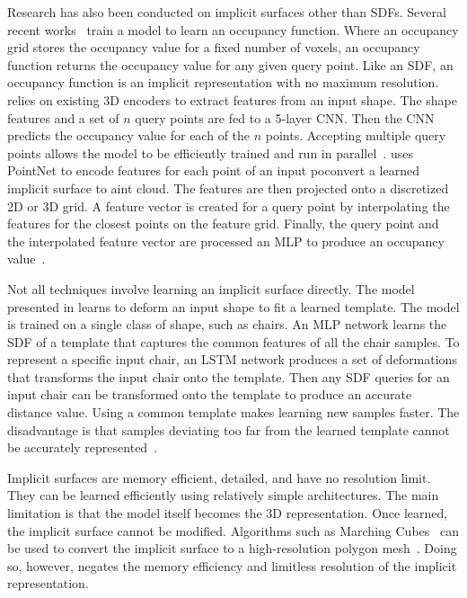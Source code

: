 Research has also been conducted on implicit surfaces other than SDFs. Several recent works~\cite{Mescheder2019, Peng2020} train a model to learn an occupancy function. Where an occupancy grid stores the occupancy value for a fixed number of voxels, an occupancy function returns the occupancy value for any given query point. Like an SDF, an occupancy function is an implicit representation with no maximum resolution. \cite{Mescheder2019} relies on existing 3D encoders to extract features from an input shape. The shape features and a set of $n$ query points are fed to a 5-layer CNN. Then the CNN predicts the occupancy value for each of the $n$ points. Accepting multiple query points allows the model to be efficiently trained and run in parallel~\cite{Mescheder2019}. \cite{Peng2020} uses PointNet to encode features for each point of an input poconvert a learned implicit surface to aint cloud. The features are then projected onto a discretized 2D or 3D grid. A feature vector is created for a query point by interpolating the features for the closest points on the feature grid. Finally, the query point and the interpolated feature vector are processed an MLP to produce an occupancy value~\cite{Peng2020}.

Not all techniques involve learning an implicit surface directly. The model presented in \cite{Zheng2021} learns to deform an input shape to fit a learned template. The model is trained on a single class of shape, such as chairs. An MLP network learns the SDF of a template that captures the common features of all the chair samples. To represent a specific input chair, an LSTM network produces a set of deformations that transforms the input chair onto the template. Then any SDF queries for an input chair can be transformed onto the template to produce an accurate distance value. Using a common template makes learning new samples faster. The disadvantage is that samples deviating too far from the learned template cannot be accurately represented~\cite{Zheng2021}.

Implicit surfaces are memory efficient, detailed, and have no resolution limit. They can be learned efficiently using relatively simple architectures. The main limitation is that the model itself becomes the 3D representation. Once learned, the implicit surface cannot be modified. Algorithms such as Marching Cubes~\cite{Lorensen1987} can be used to convert the implicit surface to a high-resolution polygon mesh~\cite{Xiao2020}. Doing so, however, negates the memory efficiency and limitless resolution of the implicit representation.

